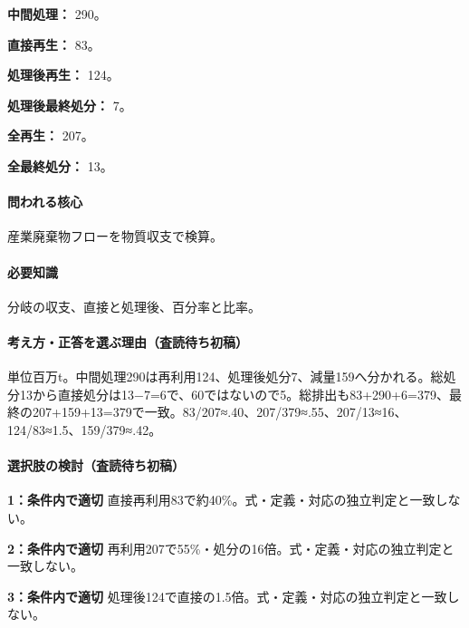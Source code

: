\noindent\textbf{中間処理：} 290。\par

\noindent\textbf{直接再生：} 83。\par

\noindent\textbf{処理後再生：} 124。\par

\noindent\textbf{処理後最終処分：} 7。\par

\noindent\textbf{全再生：} 207。\par

\noindent\textbf{全最終処分：} 13。\par

\paragraph{問われる核心} 産業廃棄物フローを物質収支で検算。

\paragraph{必要知識} 分岐の収支、直接と処理後、百分率と比率。

\paragraph{考え方・正答を選ぶ理由（査読待ち初稿）} 単位百万t。中間処理290は再利用124、処理後処分7、減量159へ分かれる。総処分13から直接処分は13−7=\allowbreak{}6で、60ではないので5。総排出も83+290+6=\allowbreak{}379、最終の207+159+13=\allowbreak{}379で一致。83/207≈.40、207/379≈.55、207/13≈16、124/83≈1.5、159/379≈.42。

\paragraph{選択肢の検討（査読待ち初稿）}\mbox{}\par

\noindent\textbf{1：条件内で適切} 直接再利用83で約40\%。式・定義・対応の独立判定と一致しない。\par

\noindent\textbf{2：条件内で適切} 再利用207で55\%・処分の16倍。式・定義・対応の独立判定と一致しない。\par

\noindent\textbf{3：条件内で適切} 処理後124で直接の1.5倍。式・定義・対応の独立判定と一致しない。\par

